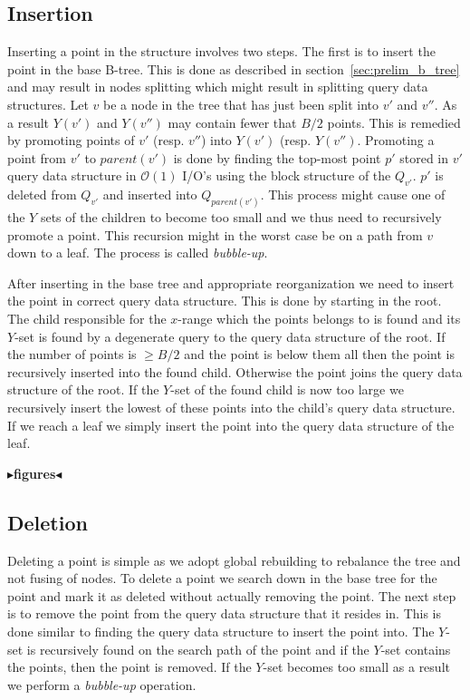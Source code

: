 \documentclass[twoside,11pt,openright]{report}
\newcommand{\todo}[1]{{\color[rgb]{.5,0,0}\textbf{$\blacktriangleright$#1$\blacktriangleleft$}}}
\begin{document}
\subsection{Insertion}
Inserting a point in the structure involves two steps. The first is to insert the point in the base B-tree. This is done as described in section~\ref{sec:prelim_b_tree} and may result in nodes splitting which might result in splitting query data structures. Let $v$ be a node in the tree that has just been split into $v'$ and $v''$. As a result $Y(v')$ and $Y(v'')$ may contain fewer that $B/2$ points. This is remedied by promoting points of $v'$ (resp. $v''$) into $Y(v')$ (resp. $Y(v'')$. Promoting a point from $v'$ to $parent(v')$ is done by finding the top-most point $p'$ stored in $v'$ query data structure in $\mathcal{O}(1)$ I/O's using the block structure of the $Q_{v'}$. $p'$ is deleted from $Q_{v'}$ and inserted into $Q_{parent(v')}$. This process might cause one of the $Y$ sets of the children to become too small and we thus need to recursively promote a point. This recursion might in the worst case be on a path from $v$ down to a leaf. The process is called \textit{bubble-up}.

After inserting in the base tree and appropriate reorganization we need to insert the point in correct query data structure. This is done by starting in the root. The child responsible for the $x$-range which the points belongs to is found and its $Y$-set is found by a degenerate query to the query data structure of the root. If the number of points is $\geq B/2$ and the point is below them all then the point is recursively inserted into the found child. Otherwise the point joins the query data structure of the root. If the $Y$-set of the found child is now too large we recursively insert the lowest of these points into the child's query data structure.
If we reach a leaf we simply insert the point into the query data structure of the leaf.

\todo{figures}

\subsection{Deletion}
Deleting a point is simple as we adopt global rebuilding to rebalance the tree and not fusing of nodes. To delete a point we search down in the base tree for the point and mark it as deleted without actually removing the point. The next step is to remove the point from the query data structure that it resides in. This is done similar to finding the query data structure to insert the point into. The $Y$-set is recursively found on the search path of the point and if the $Y$-set contains the points, then the point is removed. If the $Y$-set becomes too small as a result we perform a \textit{bubble-up} operation.
\end{document}
